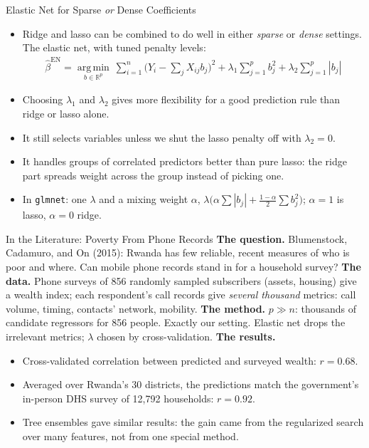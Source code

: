 \documentclass[aspectratio=169,11pt,xcolor=dvipsnames]{beamer}
\DeclareMathOperator*{\argminop}{arg\,min}
\newcommand{\argmin}{\argminop\limits}
\newcommand{\R}{\mathbb{R}}
\newcommand{\core}{\,\raisebox{0.6pt}{\textcolor{corestar}{$\bigstar$}}}
\begin{document}
\begin{frame}{Elastic Net for Sparse \emph{or} Dense Coefficients\core}
\begin{itemize}\itemsep4pt
  \item Ridge and lasso can be combined to do well in either \textit{sparse} or
        \textit{dense} settings. The elastic net, with tuned penalty levels:
  \begin{align*}
    \hat\beta^{\text{EN}} = \argmin_{b\in\R^{p}}\ \sum_{i=1}^n\big(Y_i - \textstyle\sum_{j} X_{ij} b_j\big)^2
    + \lambda_1 \sum_{j=1}^{p} b_j^2 + \lambda_2 \sum_{j=1}^{p}|b_j|
  \end{align*}
  \item Choosing $\lambda_1$ and $\lambda_2$ gives more flexibility for a good
        prediction rule than ridge or lasso alone.
  \item It still selects variables unless we shut the lasso penalty off with
        $\lambda_2 = 0$.
  \item It handles groups of correlated predictors better than pure lasso: the ridge
        part spreads weight across the group instead of picking one.
  \item In \texttt{glmnet}: one $\lambda$ and a mixing weight $\alpha$,
        $\lambda\big(\alpha\sum|b_j| + \tfrac{1-\alpha}{2}\sum b_j^2\big)$; $\alpha = 1$ is
        lasso, $\alpha = 0$ ridge.
\end{itemize}
\end{frame}

\begin{frame}{In the Literature: Poverty From Phone Records}
\textbf{The question.} Blumenstock, Cadamuro, and On (2015): Rwanda has few reliable, recent measures of who is poor and where.
Can mobile phone records stand in for a household survey?
\vskip1pt
\textbf{The data.} Phone surveys of 856 randomly sampled subscribers (assets, housing)
give a wealth index; each respondent's call records give \emph{several thousand}
metrics: call volume, timing, contacts' network, mobility.
\vskip1pt
\textbf{The method.} $p \gg n$: thousands of candidate regressors for 856 people. Exactly
our setting. \alert{Elastic net} drops the irrelevant metrics; $\lambda$ chosen by
cross-validation.
\vskip1pt
\textbf{The results.}
\begin{itemize}\itemsep1pt
  \item Cross-validated correlation between predicted and surveyed wealth: $r = 0.68$.
  \item Averaged over Rwanda's 30 districts, the predictions match the government's
        in-person DHS survey of 12,792 households: $r = 0.92$.
  \item Tree ensembles gave similar results: the gain came from the regularized
        search over many features, not from one special method.
\end{itemize}
\end{frame}
\end{document}

